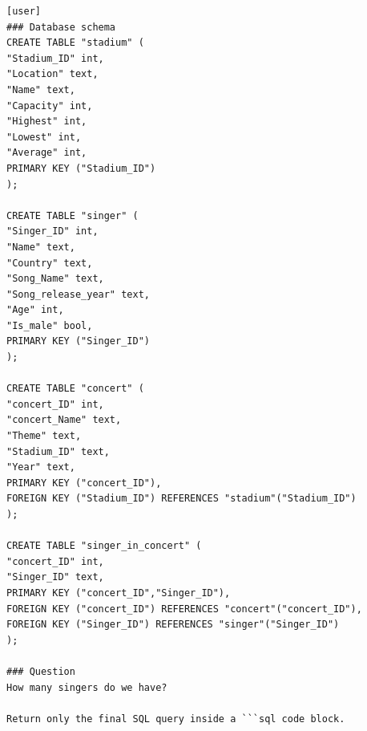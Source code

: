 \begin{lstlisting}
[user]
### Database schema
CREATE TABLE "stadium" (
"Stadium_ID" int,
"Location" text,
"Name" text,
"Capacity" int,
"Highest" int,
"Lowest" int,
"Average" int,
PRIMARY KEY ("Stadium_ID")
);

CREATE TABLE "singer" (
"Singer_ID" int,
"Name" text,
"Country" text,
"Song_Name" text,
"Song_release_year" text,
"Age" int,
"Is_male" bool,
PRIMARY KEY ("Singer_ID")
);

CREATE TABLE "concert" (
"concert_ID" int,
"concert_Name" text,
"Theme" text,
"Stadium_ID" text,
"Year" text,
PRIMARY KEY ("concert_ID"),
FOREIGN KEY ("Stadium_ID") REFERENCES "stadium"("Stadium_ID")
);

CREATE TABLE "singer_in_concert" (
"concert_ID" int,
"Singer_ID" text,
PRIMARY KEY ("concert_ID","Singer_ID"),
FOREIGN KEY ("concert_ID") REFERENCES "concert"("concert_ID"),
FOREIGN KEY ("Singer_ID") REFERENCES "singer"("Singer_ID")
);

### Question
How many singers do we have?

Return only the final SQL query inside a ```sql code block.
\end{lstlisting}
